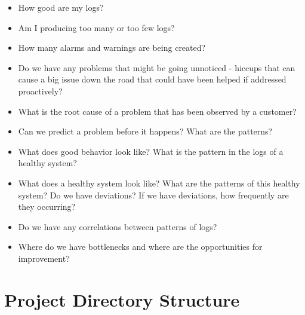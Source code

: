 \documentclass{article}
\begin{document}
\begin{itemize}
	
	\item How good are my logs?

	\item Am I producing too many or too few logs?

	\item How many alarms and warnings are being created?

	\item Do we have any problems that might be going unnoticed - hiccups that can cause a big issue down the road that could have been helped if addressed proactively?

	\item What is the root cause of a problem that has been observed by a customer?

	\item Can we predict a problem before it happens? What are the patterns?

	\item What does good behavior look like? What is the pattern in the logs of a healthy system?

	\item What does a healthy system look like? What are the patterns of this healthy system? Do we have deviations? If we have deviations, how frequently are they occurring? 

	\item Do we have any correlations between patterns of logs? 

	\item Where do we have bottlenecks and where are the opportunities for improvement?

\end{itemize}

\newpage

\section{Project Directory Structure}
\end{document}
